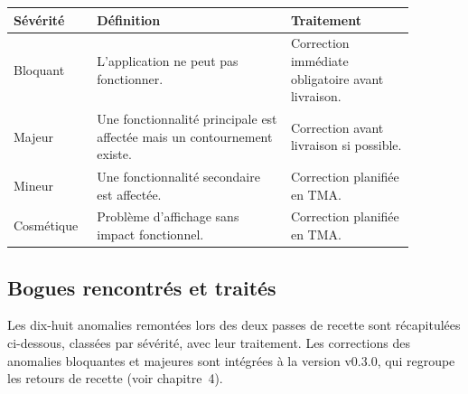 \begin{table}[H]
    \centering
    \begin{tabular}{|>{\raggedright\arraybackslash}p{0.16\linewidth}|>{\raggedright\arraybackslash}p{0.44\linewidth}|>{\raggedright\arraybackslash}p{0.28\linewidth}|}
        \hline
        \textbf{Sévérité} & \textbf{Définition} & \textbf{Traitement} \\
        \hline
        Bloquant & L'application ne peut pas fonctionner. & Correction immédiate obligatoire avant livraison. \\
        \hline
        Majeur & Une fonctionnalité principale est affectée mais un contournement existe. & Correction avant livraison si possible. \\
        \hline
        Mineur & Une fonctionnalité secondaire est affectée. & Correction planifiée en TMA. \\
        \hline
        Cosmétique & Problème d'affichage sans impact fonctionnel. & Correction planifiée en TMA. \\
        \hline
    \end{tabular}
\end{table}

\subsection{Bogues rencontrés et traités}
Les dix-huit anomalies remontées lors des deux passes de recette sont récapitulées ci-dessous, classées par sévérité, avec leur traitement. Les corrections des anomalies bloquantes et majeures sont intégrées à la version v0.3.0, qui regroupe les retours de recette (voir chapitre~4).

